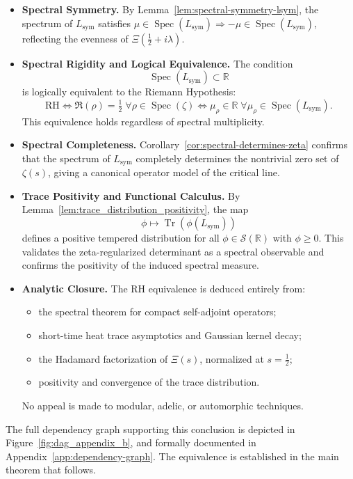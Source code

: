 \begin{itemize}
  \item \textbf{Spectral Symmetry.}  
  By Lemma~\ref{lem:spectral-symmetry-lsym}, the spectrum of \( L_{\mathrm{sym}} \) satisfies \( \mu \in \operatorname{Spec}(L_{\mathrm{sym}}) \Rightarrow -\mu \in \operatorname{Spec}(L_{\mathrm{sym}}) \), reflecting the evenness of \( \Xi(\tfrac{1}{2} + i\lambda) \).

  \item \textbf{Spectral Rigidity and Logical Equivalence.}  
  The condition
  \[
  \operatorname{Spec}(L_{\mathrm{sym}}) \subset \mathbb{R}
  \]
  is logically equivalent to the Riemann Hypothesis:
  \[
  \mathrm{RH} \iff \Re(\rho) = \tfrac{1}{2} \; \forall \rho \in \operatorname{Spec}(\zeta)
       \iff \mu_\rho \in \mathbb{R} \; \forall \mu_\rho \in \operatorname{Spec}(L_{\mathrm{sym}}).
  \]
  This equivalence holds regardless of spectral multiplicity.

  \item \textbf{Spectral Completeness.}  
  Corollary~\ref{cor:spectral-determines-zeta} confirms that the spectrum of \( L_{\mathrm{sym}} \) completely determines the nontrivial zero set of \( \zeta(s) \), giving a canonical operator model of the critical line.

  \item \textbf{Trace Positivity and Functional Calculus.}  
  By Lemma~\ref{lem:trace_distribution_positivity}, the map
  \[
  \phi \mapsto \operatorname{Tr}(\phi(L_{\mathrm{sym}}))
  \]
  defines a positive tempered distribution for all \( \phi \in \mathcal{S}(\mathbb{R}) \) with \( \phi \ge 0 \). This validates the zeta-regularized determinant as a spectral observable and confirms the positivity of the induced spectral measure.

  \item \textbf{Analytic Closure.}  
  The RH equivalence is deduced entirely from:
  \begin{itemize}
    \item the spectral theorem for compact self-adjoint operators;
    \item short-time heat trace asymptotics and Gaussian kernel decay;
    \item the Hadamard factorization of \( \Xi(s) \), normalized at \( s = \tfrac{1}{2} \);
    \item positivity and convergence of the trace distribution.
  \end{itemize}
  No appeal is made to modular, adelic, or automorphic techniques.
\end{itemize}

\medskip
\noindent
The full dependency graph supporting this conclusion is depicted in Figure~\ref{fig:dag_appendix_b}, and formally documented in Appendix~\ref{app:dependency-graph}. The equivalence is established in the main theorem that follows.
